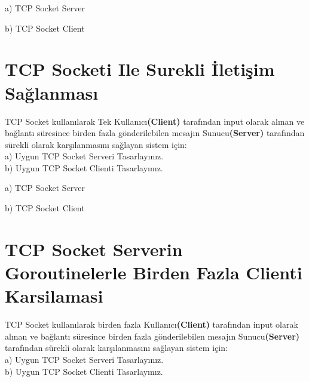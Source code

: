 a) TCP Socket Server
\vspace{2mm}


b) TCP Socket Client
\vspace{2mm}



\section{TCP Socketi Ile Surekli İletişim Sağlanması}

\begin{question}
TCP Socket kullanılarak Tek Kullanıcı\textbf{(Client)} tarafından input olarak alınan ve bağlantı süresince birden fazla gönderilebilen mesajın Sunucu\textbf{(Server)} tarafından sürekli olarak karşılanmasını sağlayan sistem için:
	\\ a) Uygun TCP Socket Serveri Tasarlayınız.
	\\ b) Uygun TCP Socket Clienti Tasarlayınız.
\end{question}


a) TCP Socket Server


b) TCP Socket Client


\vspace{20mm}

\section{TCP Socket Serverin Goroutinelerle Birden Fazla Clienti Karsilamasi}

\begin{question}
TCP Socket kullanılarak birden fazla Kullanıcı\textbf{(Client)} tarafından input olarak alınan ve bağlantı süresince birden fazla gönderilebilen mesajın Sunucu\textbf{(Server)} tarafından sürekli olarak karşılanmasını sağlayan sistem için:
	\\ a) Uygun TCP Socket Serveri Tasarlayınız.
	\\ b) Uygun TCP Socket Clienti Tasarlayınız.
\end{question}

